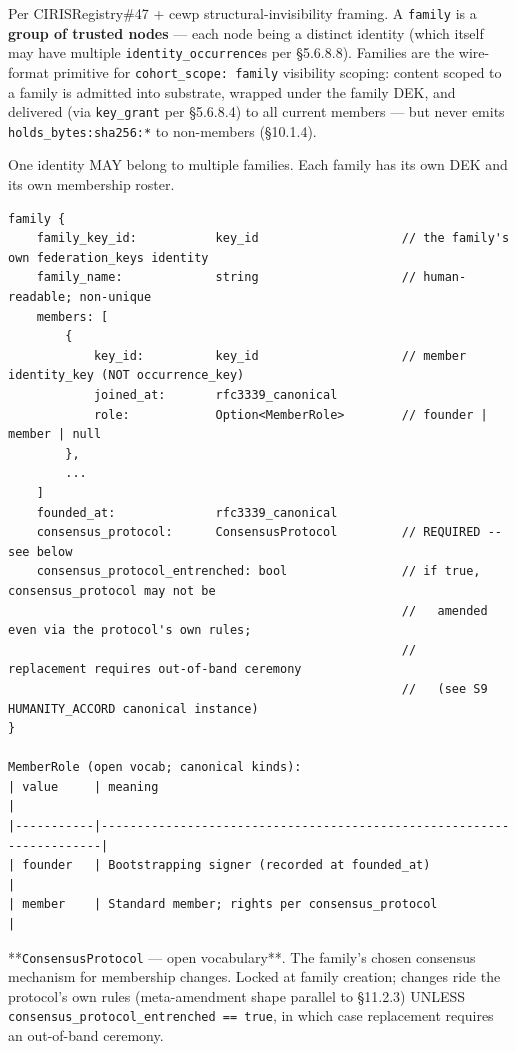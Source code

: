 \documentclass[11pt]{article}
\begin{document}
Per CIRISRegistry\#47 + cewp structural-invisibility framing. A \texttt{family} is a \textbf{group of trusted nodes} — each node being a distinct identity (which itself may have multiple \texttt{identity\_occurrence}s per §5.6.8.8). Families are the wire-format primitive for \texttt{cohort\_scope: family} visibility scoping: content scoped to a family is admitted into substrate, wrapped under the family DEK, and delivered (via \texttt{key\_grant} per §5.6.8.4) to all current members — but never emits \texttt{holds\_bytes:sha256:*} to non-members (§10.1.4).


One identity MAY belong to multiple families. Each family has its own DEK and its own membership roster.


\begin{lstlisting}
family {
    family_key_id:           key_id                    // the family's own federation_keys identity
    family_name:             string                    // human-readable; non-unique
    members: [
        {
            key_id:          key_id                    // member identity_key (NOT occurrence_key)
            joined_at:       rfc3339_canonical
            role:            Option<MemberRole>        // founder | member | null
        },
        ...
    ]
    founded_at:              rfc3339_canonical
    consensus_protocol:      ConsensusProtocol         // REQUIRED -- see below
    consensus_protocol_entrenched: bool                // if true, consensus_protocol may not be
                                                       //   amended even via the protocol's own rules;
                                                       //   replacement requires out-of-band ceremony
                                                       //   (see S9 HUMANITY_ACCORD canonical instance)
}

MemberRole (open vocab; canonical kinds):
| value     | meaning                                                              |
|-----------|----------------------------------------------------------------------|
| founder   | Bootstrapping signer (recorded at founded_at)                        |
| member    | Standard member; rights per consensus_protocol                       |
\end{lstlisting}

**\texttt{ConsensusProtocol} — open vocabulary**. The family's chosen consensus mechanism for membership changes. Locked at family creation; changes ride the protocol's own rules (meta-amendment shape parallel to §11.2.3) UNLESS \texttt{consensus\_protocol\_entrenched == true}, in which case replacement requires an out-of-band ceremony.
\end{document}
